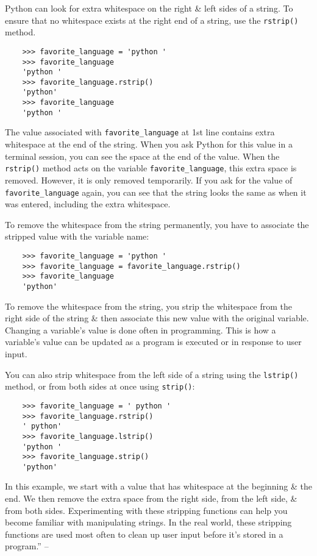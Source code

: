 \documentclass[oneside]{book}
\numberwithin{equation}{section}
\begin{document}
Python can look for extra whitespace on the right \& left sides of a string. To ensure that no whitespace exists at the right end of a string, use the \texttt{rstrip()} method.
\begin{verbatim}
	>>> favorite_language = 'python '
	>>> favorite_language
	'python '
	>>> favorite_language.rstrip()
	'python'
	>>> favorite_language
	'python '
\end{verbatim}
The value associated with \verb|favorite_language| at 1st line contains extra whitespace at the end of the string. When you ask Python for this value in a terminal session, you can see the space at the end of the value. When the \texttt{rstrip()} method acts on the variable \verb|favorite_language|, this extra space is removed. However, it is only removed temporarily. If you ask for the value of \verb|favorite_language| again, you can see that the string looks the same as when it was entered, including the extra whitespace.

To remove the whitespace from the string permanently, you have to associate the stripped value with the variable name:
\begin{verbatim}
	>>> favorite_language = 'python '
	>>> favorite_language = favorite_language.rstrip()
	>>> favorite_language
	'python'
\end{verbatim}
To remove the whitespace from the string, you strip the whitespace from the right side of the string \& then associate this new value with the original variable. Changing a variable's value is done often in programming. This is how a variable's value can be updated as a program is executed or in response to user input.

You can also strip whitespace from the left side of a string using the \texttt{lstrip()} method, or from both sides at once using \texttt{strip()}:
\begin{verbatim}
	>>> favorite_language = ' python '
	>>> favorite_language.rstrip()
	' python'
	>>> favorite_language.lstrip()
	'python '
	>>> favorite_language.strip()
	'python'
\end{verbatim}
In this example, we start with a value that has whitespace at the beginning \& the end. We then remove the extra space from the right side, from the left side, \& from both sides. Experimenting with these stripping functions can help you become familiar with manipulating strings. In the real world, these stripping functions are used most often to clean up user input before it's stored in a program.'' -- \cite[pp. 22--23]{Matthes2019}
\end{document}
